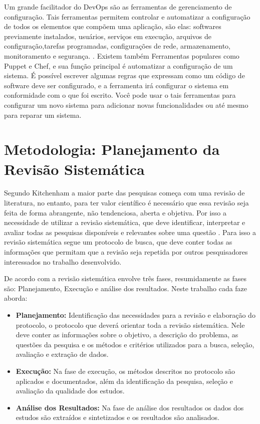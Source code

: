 \documentclass[12pt]{article}
\begin{document}
Um grande facilitador do DevOps são as ferramentas de gerenciamento de configuração. Tais ferramentas permitem controlar e automatizar a configuração de todos os elementos que compõem uma aplicação, são elas: softwares previamente instalados, usuários, serviços em execução, arquivos de configuração,tarefas programadas, configurações de rede, armazenamento, monitoramento e segurança. \cite{6265084}. Existem também Ferramentas populares como Puppet e Chef, e sua função principal é automatizar a configuração de um sistema. É possível escrever algumas regras que expressam como um código de software deve ser configurado, e a ferramenta irá configurar o sistema em conformidade com o que foi escrito. Você pode usar o tais  ferramentas para configurar um novo sistema para adicionar novas funcionalidades ou até mesmo para reparar um sistema.

\section{Metodologia: Planejamento da Revisão Sistemática} \label{sec3}

Segundo Kitchenham \cite{kitchenham2004procedures} a maior parte das pesquisas começa com uma revisão de literatura, no entanto, para ter valor científico é necessário que essa revisão seja feita de forma abrangente, não tendenciosa, aberta e objetiva. Por isso a necessidade de utilizar a revisão sistemática, que deve identificar, interpretar e avaliar todas as pesquisas disponíveis e relevantes sobre uma questão \cite{keele2007guidelines}. Para isso a revisão sistemática segue um protocolo de busca, que deve conter todas as informações que permitam que a revisão seja repetida por outros pesquisadores interessados no trabalho desenvolvido.

De acordo com \cite{brereton2007lessons} a revisão sistemática envolve três fases, resumidamente as fases são: Planejamento, Execução e análise dos resultados. Neste trabalho cada faze aborda:

 \begin{itemize}
   \item  \textbf{Planejamento: } Identificação  das  necessidades  para  a  revisão  e  elaboração do protocolo, o protocolo que deverá orientar toda a revisão sistemática. Nele deve conter as informações sobre o objetivo, a descrição do problema, as questões
da pesquisa e os métodos e critérios utilizados para a busca, seleção, avaliação e extração de dados.
   \item  \textbf{Execução: } Na fase de execução, os métodos descritos no protocolo são aplicados e documentados, além da identificação da pesquisa, seleção e avaliação da qualidade  dos  estudos.
      \item  \textbf{Análise dos Resultados: }Na fase de análise dos resultados os dados dos estudos são extraídos e sintetizados e os
resultados são analisados.
 \end{itemize}
\end{document}
